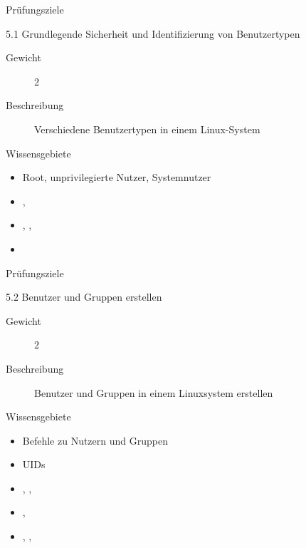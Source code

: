 \documentclass[aspectratio=43]{beamer}
\begin{document}
\begin{frame}{Prüfungsziele}
  \begin{alertblock}{5.1 Grundlegende Sicherheit und Identifizierung von Benutzertypen}
    \begin{description}
      \item[Gewicht]  2
      \item[Beschreibung] Verschiedene Benutzertypen in einem Linux-System
    \end{description}
       Wissensgebiete\\ 
        \begin{itemize}
          \item Root, unprivilegierte Nutzer, Systemnutzer
          \item {}, 
          \item {}, , 
          \item {}
        \end{itemize}
  \end{alertblock}
\end{frame}
\begin{frame}{Prüfungsziele}
  \begin{alertblock}{5.2 Benutzer und Gruppen erstellen}
    \begin{description}
      \item[Gewicht]  2
      \item[Beschreibung] Benutzer und Gruppen in einem Linuxsystem erstellen
    \end{description}
       Wissensgebiete\\ 
        \begin{itemize}
          \item Befehle zu Nutzern und Gruppen
          \item UIDs
          \item {}, , 
          \item {}, 
          \item {}, , 
        \end{itemize}
  \end{alertblock}
\end{frame}
\end{document}
